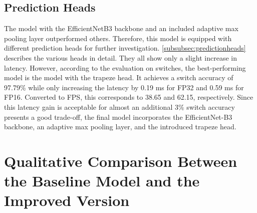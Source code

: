 \subsection{Prediction Heads}

\begin{table}[H]
    \centering
    \caption{Prediction Heads Results}
    \label{tab:predHeadsResults}
\end{table}

The model with the EfficientNetB3 backbone and an included adaptive max pooling layer outperformed others.
Therefore, this model is equipped with different prediction heads for further investigation.
\autoref{subsubsec:predictionheads} describes the various heads in detail.
They all show only a slight increase in latency.
However, according to the evaluation on switches, the best-performing model is the model with the trapeze head.
It achieves a switch accuracy of 97.79\% while only increasing the latency by 0.19 ms for FP32 and 0.59 ms for FP16.
Converted to \ac{FPS}, this corresponds to 38.65 and 62.15, respectively.
Since this latency gain is acceptable for almost an additional 3\% switch accuracy presents a good trade-off, the final model incorporates the EfficientNet-B3 backbone, an adaptive max pooling layer, and the introduced trapeze head.

\section{Qualitative Comparison Between the Baseline Model and the Improved Version}
\label{sec:qualitativeComparison}

